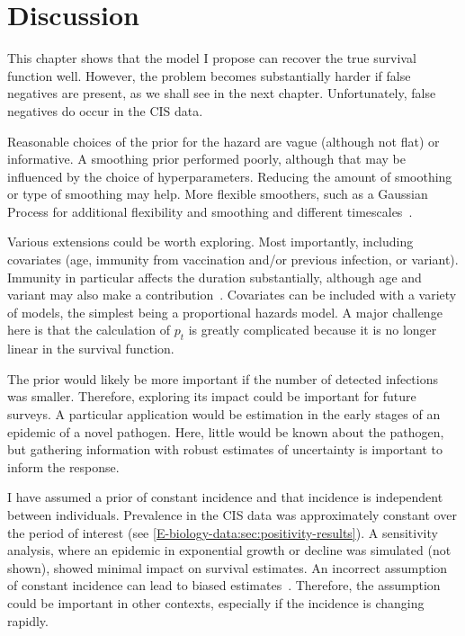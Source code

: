 \documentclass[thesis.tex]{subfiles}
\begin{document}
\section{Discussion} \label{perf-test:sec:discussion}

This chapter shows that the model I propose can recover the true survival function well.
However, the problem becomes substantially harder if false negatives are present, as we shall see in the next chapter.
Unfortunately, false negatives do occur in the CIS data.

Reasonable choices of the prior for the hazard are vague (although not flat) or informative.
A smoothing prior performed poorly, although that may be influenced by the choice of hyperparameters.
Reducing the amount of smoothing or type of smoothing may help.
More flexible smoothers, such as a Gaussian Process for additional flexibility and smoothing and different timescales~\autocite{saulGaussian}.

Various extensions could be worth exploring.
Most importantly, including covariates (\eg age, immunity from vaccination and/or previous infection, or variant).
Immunity in particular affects the duration substantially, although age and variant may also make a contribution~\autocite{hakkiOnset,russellWithinhost}.
Covariates can be included with a variety of models, the simplest being a proportional hazards model.
A major challenge here is that the calculation of $p_t$ is greatly complicated because it is no longer linear in the survival function.

The prior would likely be more important if the number of detected infections was smaller.
Therefore, exploring its impact could be important for future surveys.
A particular application would be estimation in the early stages of an epidemic of a novel pathogen.
Here, little would be known about the pathogen, but gathering information with robust estimates of uncertainty is important to inform the response.

I have assumed a prior of constant incidence and that incidence is independent between individuals.
Prevalence in the CIS data was approximately constant over the period of interest (see \cref{E-biology-data:sec:positivity-results}).
A sensitivity analysis, where an epidemic in exponential growth or decline was simulated (not shown), showed minimal impact on survival estimates.
An incorrect assumption of constant incidence can lead to biased estimates~\autocite{degruttolaAnalysis}.
Therefore, the assumption could be important in other contexts, especially if the incidence is changing rapidly.
\end{document}
